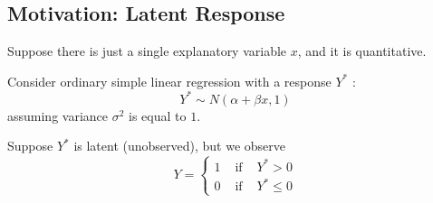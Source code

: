 \documentclass[11pt]{elegantbook}
\begin{document}
\subsection{Motivation: Latent Response}

Suppose there is just a single explanatory variable $x$, and it is quantitative.

Consider ordinary simple linear regression with a response $Y^*$ :
$$
Y^* \sim N(\alpha+\beta x, 1)
$$
assuming variance $\sigma^2$ is equal to $1$.

Suppose $Y^*$ is latent (unobserved), but we observe
$$
Y=\left\{\begin{array}{lll}
1 & \text { if } & Y^*>0 \\
0 & \text { if } & Y^* \leq 0
\end{array}\right.
$$
\end{document}
